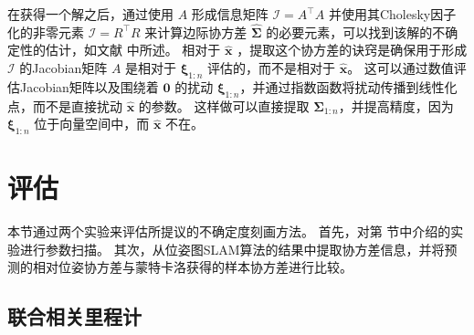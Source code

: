 在获得一个解之后，通过使用 $A$ 形成信息矩阵 $\mathcal{I}= A^\top A$ 并使用其Cholesky因子化的非零元素 $\mathcal{I}= R^\top R$ 来计算边际协方差 $\hat{\boldsymbol{\Sigma}}$ 的必要元素，可以找到该解的不确定性的估计，如文献 \cite{kaess2009covariance} 中所述。 
相对于 $\hat{\mathbf{x}}$ ，提取这个协方差的诀窍是确保用于形成 $\mathcal{I}$ 的Jacobian矩阵 $A$ 是相对于 $\boldsymbol{\xi}_{1:n}$ 评估的，而不是相对于 $\hat{\mathbf{x}}$。 
这可以通过数值评估Jacobian矩阵以及围绕着 $\mathbf{0}$ 的扰动 $\boldsymbol{\xi}_{1:n}$，并通过指数函数将扰动传播到线性化点，而不是直接扰动 $\hat{\mathbf{x}}$ 的参数。
这样做可以直接提取 $\boldsymbol{\Sigma}_{1:n}$，并提高精度，因为 $\boldsymbol{\xi}_{1:n}$ 位于向量空间中，而 $\hat{\mathbf{x}}$ 不在。 

\section{评估}
\label{sec:eval}

本节通过两个实验来评估所提议的不确定度刻画方法。 
首先，对第  节中介绍的实验进行参数扫描。 
其次，从位姿图SLAM算法的结果中提取协方差信息，并将预测的相对位姿协方差与蒙特卡洛获得的样本协方差进行比较。 

\subsection{联合相关里程计}
\label{sec:eval:composition}

